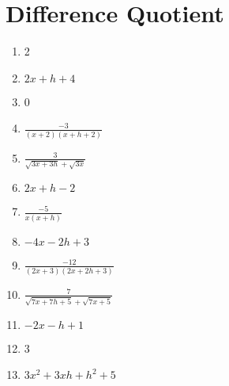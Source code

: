 \section*{Difference Quotient}
\begin{multicols}{2}
\begin{enumerate}
	\item 2
	\item $2x + h + 4$
	\item 0
    \item $\frac{-3}{(x+2)(x+h+2)}$
    \item $\frac{3}{\sqrt{3x+3h}+\sqrt{3x}}$
    \item $2x+h-2$
    \item $\frac{-5}{x(x+h)}$
    \item $-4x-2h+3$
    \item $\frac{-12}{(2x+3)(2x+2h+3)}$
    \item $\frac{7}{\sqrt{7x+7h+5}+\sqrt{7x+5}}$
    \item $-2x - h + 1$
    \item 3
    \item $3x^2 + 3xh + h^2 + 5$
\end{enumerate}
\end{multicols}